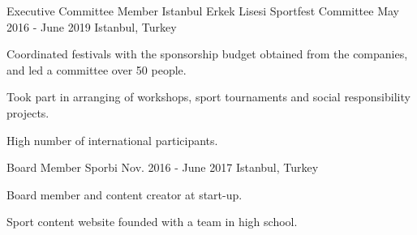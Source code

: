 
\begin{cventries}

  \cventry
    {Executive Committee Member}
    {Istanbul Erkek Lisesi Sportfest Committee}
    {May 2016 - June 2019}
    {Istanbul, Turkey}
    {
    \begin{cvitems}
        \item {Coordinated festivals with the sponsorship budget obtained from the companies, and led a committee over 50 people.}
        \item {Took part in arranging of workshops, sport tournaments and social responsibility projects.}
        \item {High number of international participants.}
    \end{cvitems}
    }

  \cventry
    {Board Member}
    {Sporbi}
    {Nov. 2016 - June 2017}
    {Istanbul, Turkey}
    {
      \begin{cvitems}
        \item {Board member and content creator at start-up.}
        \item {Sport content website founded with a team in high school.}
      \end{cvitems}
    }

\end{cventries}
